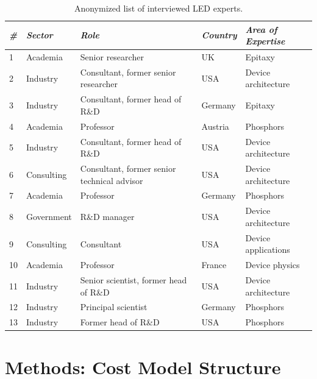 \documentclass[parskip=full]{article}
\begin{document}
\begin{table}[H]
\small
    \centering
    \caption{Anonymized list of interviewed LED experts.}
    \begin{tabular}{|l|l|l|l|l|}
    \hline
        \textit{\#} & \textit{Sector} & \textit{Role} & \textit{Country} & \textit{Area of Expertise} \\ \hline
        1 & Academia & Senior researcher & UK & Epitaxy \\ \hline
        2 & Industry & Consultant, former senior researcher & USA & Device architecture \\ \hline
        3 & Industry & Consultant, former head of R\&D & Germany & Epitaxy \\ \hline
        4 & Academia & Professor & Austria & Phosphors \\ \hline
        5 & Industry & Consultant, former head of R\&D & USA & Device architecture \\ \hline
        6 & Consulting & Consultant, former senior technical advisor & USA & Device architecture \\ \hline
        7 & Academia & Professor & Germany & Phosphors \\ \hline
        8 & Government & R\&D manager & USA & Device architecture \\ \hline
        9 & Consulting & Consultant & USA & Device applications \\ \hline
        10 & Academia & Professor & France & Device physics \\ \hline
        11 & Industry & Senior scientist, former head of R\&D & USA & Device architecture \\ \hline
        12 & Industry & Principal scientist & Germany & Phosphors \\ \hline
        13 & Industry & Former head of R\&D & USA & Phosphors \\ \hline
    \end{tabular}
    \label{tab:interviews}
\end{table}

\clearpage
\section{Methods: Cost Model Structure}
\label{sec:costmodel_structure}
\end{document}
